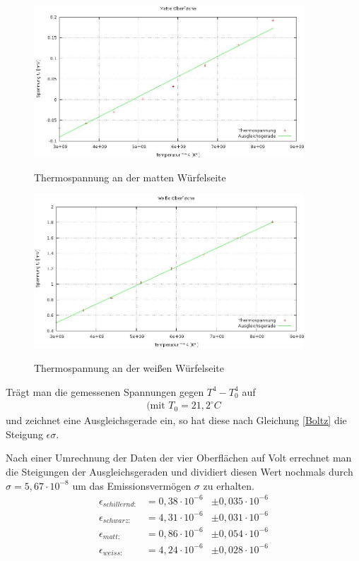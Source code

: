 \begin{figure}[H]
\includegraphics[width=0.9\textwidth]{pics/temp_matt.jpg}
\label{abstand}
\caption{Thermospannung an der matten Würfelseite}
\end{figure}

\begin{figure}[H]
\includegraphics[width=0.9\textwidth]{pics/temp_weis.jpg}
\label{abstand}
\caption{Thermospannung an der weißen Würfelseite}
\end{figure}

Trägt man die gemessenen Spannungen gegen $T^4-T_0^4$ auf
\begin{align*}
\text{(mit } T_0=21,2^\circ C 
\end{align*}
und zeichnet eine Ausgleichsgerade ein, so hat diese nach Gleichung \eqref{Boltz} die Steigung $\epsilon\sigma$.

Nach einer Umrechnung der Daten der vier Oberflächen auf Volt errechnet man die Steigungen der Ausgleichsgeraden und dividiert diesen Wert nochmals durch $\sigma = 5,67\cdot 10^{-8}$ um das Emissionsvermögen $\sigma$ zu erhalten. 
\begin{align*}
\epsilon_{schillernd: }		&= 0,38\cdot10^{-6}     &\pm 0,035\cdot 10^{-6}  \\
\epsilon_{schwarz: }	 	&= 4,31\cdot10^{-6}     &\pm 0,031\cdot 10^{-6}  \\
\epsilon_{matt: }		 	&= 0,86\cdot10^{-6}     &\pm 0,054\cdot 10^{-6}  \\
\epsilon_{weiss: } 			&= 4,24\cdot10^{-6}     &\pm 0,028\cdot 10^{-6}  \\
\end{align*} 

